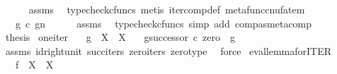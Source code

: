 \begin{isabellebody}
\ \ \ \ \isamarkupfalse%
\ assms\ \isamarkupfalse%
\ {\isacharparenleft}{\kern0pt}typecheck{\isacharunderscore}{\kern0pt}cfuncs{\isacharcomma}{\kern0pt}\ metis\ iter{\isacharunderscore}{\kern0pt}comp{\isacharunderscore}{\kern0pt}def{}\ metafunc{\isacharunderscore}{\kern0pt}cnufatem{\isacharparenright}{\kern0pt}\isanewline
\ \ \isamarkupfalse%
\ \isamarkupfalse%
\ {\isachardoublequoteopen}{\isachardot}{\kern0pt}{\isachardot}{\kern0pt}{\isachardot}{\kern0pt}\ {\isacharequal}{\kern0pt}\ g\ {\isasymcirc}\isactrlsub c\ {\isacharparenleft}{\kern0pt}g\isactrlbsup {\isasymcirc}n\isactrlesup {\isacharparenright}{\kern0pt}{\isachardoublequoteclose}\isanewline
\ \ \ \ \isamarkupfalse%
\ assms\ \isamarkupfalse%
\ {\isacharparenleft}{\kern0pt}typecheck{\isacharunderscore}{\kern0pt}cfuncs{\isacharcomma}{\kern0pt}\ simp\ add{\isacharcolon}{\kern0pt}\ comp{\isacharunderscore}{\kern0pt}as{\isacharunderscore}{\kern0pt}metacomp{\isacharparenright}{\kern0pt}\isanewline
\ \ \isamarkupfalse%
\ \isamarkupfalse%
\ {\isacharquery}{\kern0pt}thesis\isacommand{{\isachardot}{\kern0pt}}\isamarkupfalse%
\isanewline
{}\isamarkupfalse%
%
\endisatagproof
{\isafoldproof}%
%
\isadelimproof
\isanewline
%
\endisadelimproof
\isanewline
{}\isamarkupfalse%
\ one{\isacharunderscore}{\kern0pt}iter{\isacharcolon}{\kern0pt}\isanewline
\ \ \ {\isachardoublequoteopen}g\ {\isacharcolon}{\kern0pt}\ X\ {\isasymrightarrow}\ X{\isachardoublequoteclose}\isanewline
\ \ \ {\isachardoublequoteopen}g\isactrlbsup {\isasymcirc}{\isacharparenleft}{\kern0pt}successor\ {\isasymcirc}\isactrlsub c\ zero{\isacharparenright}{\kern0pt}\isactrlesup \ {\isacharequal}{\kern0pt}\ g{\isachardoublequoteclose}\isanewline
%
\isadelimproof
\ \ %
\endisadelimproof
%
\isatagproof
{}\isamarkupfalse%
\ assms\ id{\isacharunderscore}{\kern0pt}right{\isacharunderscore}{\kern0pt}unit{}\ succ{\isacharunderscore}{\kern0pt}iters\ zero{\isacharunderscore}{\kern0pt}iters\ zero{\isacharunderscore}{\kern0pt}type\ \isamarkupfalse%
\ force%
\endisatagproof
{\isafoldproof}%
%
\isadelimproof
\isanewline
%
\endisadelimproof
\isanewline
{}\isamarkupfalse%
\ eval{\isacharunderscore}{\kern0pt}lemma{\isacharunderscore}{\kern0pt}for{\isacharunderscore}{\kern0pt}ITER{\isacharcolon}{\kern0pt}\isanewline
\ \ \ {\isachardoublequoteopen}f\ {\isacharcolon}{\kern0pt}\ X\ {\isasymrightarrow}\ X{\isachardoublequoteclose}\isanewline

\end{isabellebody}
